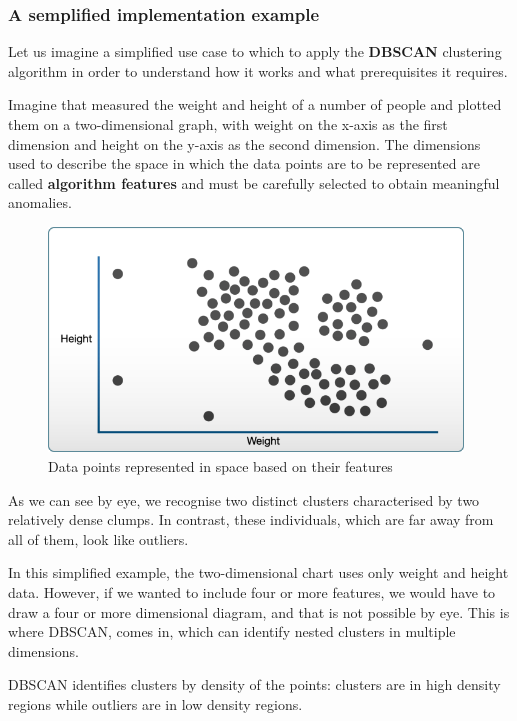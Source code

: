     
    \subsubsection{A semplified implementation example}
    \label{subsec:dbscan-example}
    
    Let us imagine a simplified use case to which to apply the \textbf{DBSCAN} clustering algorithm in order to understand how it works and what prerequisites it requires.
    
    Imagine that measured the weight and height of a number of people and plotted them on a two-dimensional graph, with weight on the x-axis as the first dimension and height on the y-axis as the second dimension.
    The dimensions used to describe the space in which the data points are to be represented are called \textbf{algorithm features} and must be carefully selected to obtain meaningful anomalies.
    
    \begin{figure}[H]
        \centering
        \includegraphics[width=11cm]{Images/1/dbscan-ex-1.png}
        \caption{Data points represented in space based on their features}
    \end{figure}
    
    As we can see by eye, we recognise two distinct clusters characterised by two relatively dense clumps. In contrast, these individuals, which are far away from all of them, look like outliers.
    
    In this simplified example, the two-dimensional chart uses only weight and height data. However, if we wanted to include four or more features, we would have to draw a four or more dimensional diagram, and that is not possible by eye. This is where DBSCAN,  comes in, which can identify nested clusters in multiple dimensions.
    
    DBSCAN identifies clusters by density of the points: clusters are in high density regions while outliers are in low density regions.
    
